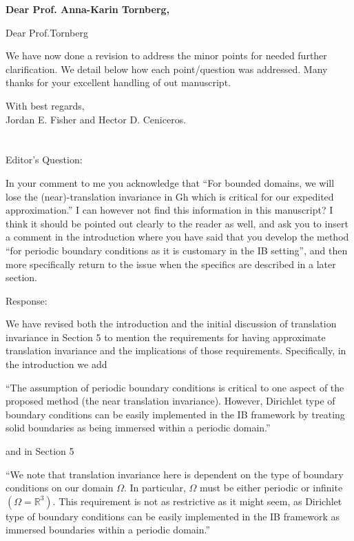 \documentclass[12pt]{article}
\title{}
\author{}
\newcommand{\BB}[1]{\mathbb{#1}}
\begin{document}
\maketitle
{\bf Dear Prof. Anna-Karin Tornberg,}

Dear Prof.Tornberg

We have now done a revision to address the minor points for needed further
clarification. 
We detail below how each point/question was addressed.
Many thanks for your excellent handling of out manuscript.

With best regards, \\

Jordan E. Fisher and Hector D. Ceniceros. \\ \\ \\


Editor's Question:

In your comment to me you acknowledge that ``For bounded domains, we will lose the (near)-translation invariance in Gh which is critical for our expedited
approximation.'' I can however not find this information in this manuscript? I think it should be pointed out clearly to the reader as well, and ask you to insert a comment in the introduction where you have said that you develop the method ``for periodic boundary conditions as it is customary in the IB setting'', and then more specifically return to the issue when the specifics are described in a later section.

Response:

We have revised both the introduction and the initial discussion of translation
invariance in Section 5 to mention the requirements for having approximate
translation invariance and the implications of those requirements. Specifically, in the introduction we add

``The assumption of periodic boundary conditions is critical to one aspect of the
proposed method (the near translation invariance). However, Dirichlet type of
boundary conditions can be easily implemented in the IB framework by treating solid boundaries as being immersed within a periodic domain.'' 

and in Section 5

``We note that translation invariance here is dependent on the type of boundary
conditions on our domain $\Omega$. In particular, $\Omega$ must be either periodic or infinite $(\Omega = \BB{R}^3)$. This requirement is not as restrictive as it might seem, as Dirichlet type of boundary conditions can be  easily implemented in the IB framework as immersed boundaries within a periodic domain.''
\end{document}
